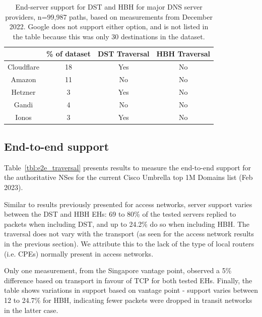\documentclass[conference]{IEEEtran}
\begin{document}
\begin{table} 
\begin{tabular}{c|c|c|c}
           & \% of dataset &  DST Traversal & HBH Traversal\\
\hline
Cloudflare & 18                      & Yes                & No                 \\
\hline
Amazon     & 11                     & No                 & No                 \\
\hline
Hetzner    & 3                     & Yes                & No                 \\
\hline
Gandi      & 4                     & No                 & No                 \\
\hline
Ionos      & 3                    & Yes                & No                
\end{tabular}
\label{tbl:provider_support}
\caption{End-server support for DST and HBH for major DNS server providers, n=99,987 paths, based on measurements from December 2022. Google does not support either option, and is not listed in the table because this was only 30 destinations in the dataset.
}
\end{table}

\subsection{End-to-end support}
\label{subsec:e2esupport}

Table~\ref{tbl:e2e_traversal} presents results to measure the end-to-end support for the authoritative NSes for the current Cisco Umbrella top 1M Domains list (Feb 2023).

Similar to results previously presented for access networks, server support varies between the DST and HBH EHs: 69 to 80\% of the tested servers replied to packets when including DST, and up to 24.2\% do so when including HBH. The traversal does not vary with the transport (as seen for the access network results in the previous section). We attribute this to the lack of the type of local routers (i.e. CPEs) normally present in access networks. 

Only one measurement, from the Singapore vantage point, observed a 5\% difference based on transport in favour of TCP for both tested EHs.
Finally, the table shows variations in support based on vantage point - support varies between 12 to 24.7\% for HBH, indicating fewer packets were dropped in transit networks in the latter case.
\end{document}

